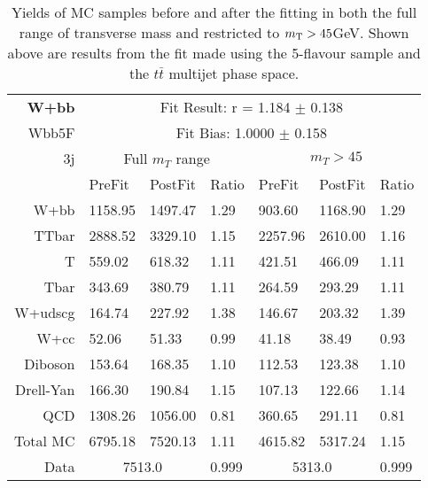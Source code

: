 \begin{table}[htb]
\begin{center}
\begin{tabular}{r|l|l|l|l|l|l}
\bf{W+bb} & \multicolumn{6}{c}{Fit Result: r = 1.184 $\pm$ 0.138}\\ 
Wbb5F & \multicolumn{6}{c}{Fit Bias: 1.0000 $\pm$ 0.158}\\ 
3j & \multicolumn{3}{c}{Full $m_T$ range} & \multicolumn{3}{c}{$m_T>45$}\\ 
{} & PreFit & PostFit & Ratio & PreFit & PostFit & Ratio \\ \hline 
W+bb  &	 1158.95 &	 1497.47 &	 1.29 &	 903.60 &	 1168.90 &	 1.29\\ 
TTbar  &	 2888.52 &	 3329.10 &	 1.15 &	 2257.96 &	 2610.00 &	 1.16\\ 
T  &	 559.02 &	 618.32 &	 1.11 &	 421.51 &	 466.09 &	 1.11\\ 
Tbar  &	 343.69 &	 380.79 &	 1.11 &	 264.59 &	 293.29 &	 1.11\\ 
W+udscg  &	 164.74 &	 227.92 &	 1.38 &	 146.67 &	 203.32 &	 1.39\\ 
W+cc  &	 52.06 &	 51.33 &	 0.99 &	 41.18 &	 38.49 &	 0.93\\ 
Diboson  &	 153.64 &	 168.35 &	 1.10 &	 112.53 &	 123.38 &	 1.10\\ 
Drell-Yan  &	 166.30 &	 190.84 &	 1.15 &	 107.13 &	 122.66 &	 1.14\\ 
QCD  &	 1308.26 &	 1056.00 &	 0.81 &	 360.65 &	 291.11 &	 0.81\\ 
Total MC  &	 6795.18 &	 7520.13 &	 1.11 &	 4615.82 &	 5317.24 &	 1.15\\ 
\hline \hline 
Data & \multicolumn{2}{c|}{7513.0} & 0.999 & \multicolumn{2}{c|}{5313.0} & 0.999 
\end{tabular}
\caption{
 Yields of MC samples before and after the fitting
  in both the full range of transverse mass and restricted 
  to $m_\mathrm{T}>45$GeV.
 Shown above are results from the fit made using the 5-flavour \Wbb sample and the
  $t\bar{t}$ multijet phase space.}
\label{tab:fitYields_5F_3j}
\end{center}
\end{table}


